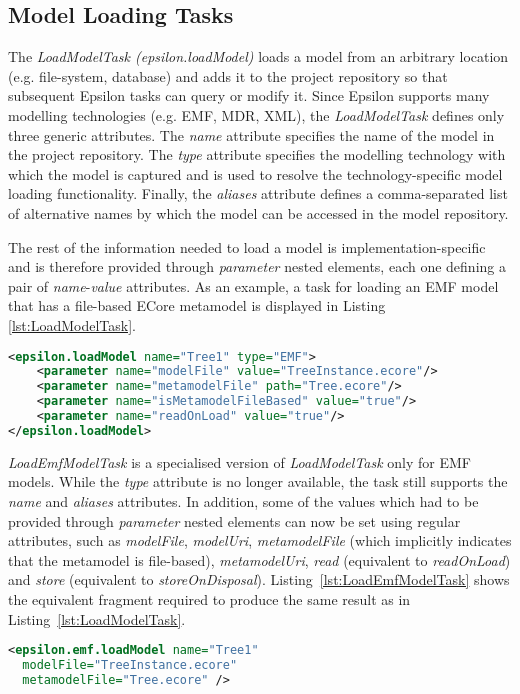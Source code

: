 \subsection{Model Loading Tasks}

The \textit{LoadModelTask (epsilon.loadModel)} loads a model from an arbitrary location (e.g. file-system, database) and adds it to the project repository so that subsequent Epsilon tasks can query or modify it. Since Epsilon supports many modelling technologies (e.g. EMF, MDR, XML), the \textit{LoadModelTask} defines only three generic attributes. The \textit{name} attribute specifies the name of the model in the project repository. The \textit{type} attribute specifies the modelling technology with which the model is captured and is used to resolve the technology-specific model loading functionality. Finally, the \textit{aliases} attribute defines a comma-separated list of alternative names by which the model can be accessed in the model repository.

The rest of the information needed to load a model is implementation-specific and is therefore provided through \textit{parameter} nested elements, each one defining a pair of \textit{name}-\textit{value} attributes. As an example, a task for loading an EMF model that has a file-based ECore metamodel is displayed in Listing \ref{lst:LoadModelTask}.

\begin{lstlisting}[basicstyle=\ttfamily\footnotesize, nolol=true, flexiblecolumns=true, caption=Loading an EMF model using the epsilon.loadModel task, label=lst:LoadModelTask, language=XML]
<epsilon.loadModel name="Tree1" type="EMF">
	<parameter name="modelFile" value="TreeInstance.ecore"/>
	<parameter name="metamodelFile" path="Tree.ecore"/>
	<parameter name="isMetamodelFileBased" value="true"/>
	<parameter name="readOnLoad" value="true"/>
</epsilon.loadModel>
\end{lstlisting}%

\textit{LoadEmfModelTask} is a specialised version of \textit{LoadModelTask} only for EMF models. While the \textit{type} attribute is no longer available, the task still supports the \textit{name} and \textit{aliases} attributes. In addition, some of the values which had to be provided through \textit{parameter} nested elements can now be set using regular attributes, such as \textit{modelFile}, \textit{modelUri}, \textit{metamodelFile} (which implicitly indicates that the metamodel is file-based), \textit{metamodelUri}, \textit{read} (equivalent to \textit{readOnLoad}) and \textit{store} (equivalent to \textit{storeOnDisposal}). Listing~\ref{lst:LoadEmfModelTask} shows the equivalent fragment required to produce the same result as in Listing~\ref{lst:LoadModelTask}.

\begin{lstlisting}[float=tbp, basicstyle=\ttfamily\footnotesize, nolol=true, flexiblecolumns=true, caption=Loading an EMF model using the epsilon.emf.loadModel task, label=lst:LoadEmfModelTask, language=XML]
<epsilon.emf.loadModel name="Tree1"
  modelFile="TreeInstance.ecore"
  metamodelFile="Tree.ecore" />
\end{lstlisting}
